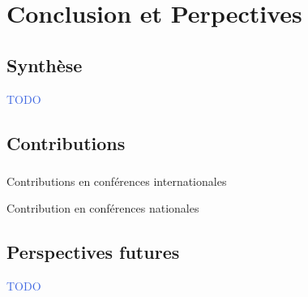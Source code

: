 \documentclass[../main.tex]{subfiles}
\begin{document}
\section{Conclusion et Perpectives}

\subsection{Synthèse}

\begin{frame}{\secname}
  \begin{center}
    \textcolor{RoyalBlue}{TODO}
  \end{center}
\end{frame}

\subsection{Contributions}
\begin{frame}
  \frametitle{\secname}

  Contributions en conférences internationales

  \vspace{1 em}

  \nocite{moniereDASIP22, moniereTimeSlidingWindow2021}
  \renewcommand*{\bibfont}{\tiny}
  \printbibliography[category=own-conf-en, heading=none]

  \vspace{2 em}

  Contribution en conférences nationales

  \vspace{1 em}

  \nocite{moniereImplementationsLogiciellesMaterielles2022}
  \renewcommand*{\bibfont}{\tiny}
  \printbibliography[category=own-conf-fr, heading=none]

\end{frame}

\subsection{Perspectives futures}

\begin{frame}{\secname}
  \begin{center}
    \textcolor{RoyalBlue}{TODO}
  \end{center}
\end{frame}
\end{document}
